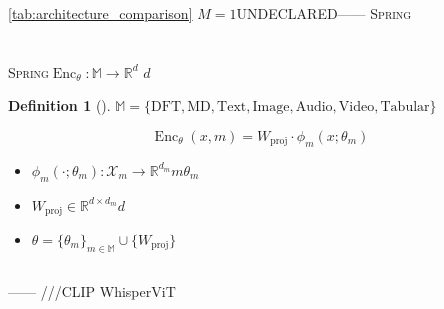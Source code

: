 \documentclass[12pt,a4paper]{article}
\newtheorem{definition}[theorem]{Definition}
\theoremstyle{remark}
\newcommand{\R}{\mathbb{R}}
\newcommand{\X}{\mathcal{X}}
\newcommand{\Spring}{\textsc{Spring}}
\newcommand{\ModalitySet}{\ensuremath{\mathbb{M}}}
\DeclareMathOperator{\Enc}{Enc}
\begin{document}
\ref{tab:architecture_comparison}
$M=1$UNDECLARED——
\Spring{}

\newpage

\section{}

\subsection{}

\Spring{}\textbf{}$\Enc_\theta: \ModalitySet \to \R^d$
$d$

\begin{definition}[]\label{def:encoder}
$\ModalitySet = \{\text{DFT}, \text{MD}, \text{Text}, \text{Image}, \text{Audio}, \text{Video}, \text{Tabular}\}$

\begin{equation}\label{eq:encoder_def}
    \Enc_\theta(x, m) = W_{\text{proj}} \cdot \phi_m(x; \theta_m)
\end{equation}

\begin{itemize}[nosep]
    \item $\phi_m(\cdot; \theta_m): \X_m \to \R^{d_m}$$m$$\theta_m$
    \item $W_{\text{proj}} \in \R^{d \times d_m}$$d$
    \item $\theta = \{\theta_m\}_{m \in \ModalitySet} \cup \{W_{\text{proj}}\}$
\end{itemize}
\end{definition}

\subsection{}

——
///CLIP
WhisperViT
\end{document}
